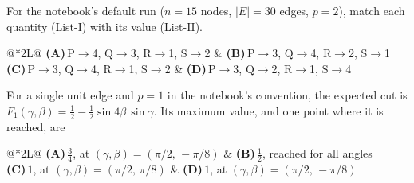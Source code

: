 \documentclass[11pt,a4paper]{article}
\newcommand{\optlabel}[1]{\textbf{(#1)}}
\newenvironment{qitem}[1]{\begin{list}{}{\setlength{\leftmargin}{3.3em}\setlength{\labelwidth}{3.1em}%
  \setlength{\labelsep}{0.2em}\setlength{\topsep}{3pt}\setlength{\parsep}{3pt}}\item[\textbf{Q.#1}\hfill]}{\end{list}}
\newcommand{\qsep}{\par\vspace{2pt}{\color{black!15}\hrule}\vspace{4pt}}
\begin{document}
\begin{qitem}{46}
For the notebook's default run ($n = 15$ nodes, $|E| = 30$ edges, $p = 2$), match each quantity (List-I) with its value
(List-II).
\par\smallskip{}
\par\smallskip\noindent\begin{tabularx}{\linewidth}{@{}*{2}{L}@{}}
\optlabel{A}\,P$\to$4, Q$\to$3, R$\to$1, S$\to$2 & \optlabel{B}\,P$\to$3, Q$\to$4, R$\to$2, S$\to$1 \\[3pt]
\optlabel{C}\,P$\to$3, Q$\to$4, R$\to$1, S$\to$2 & \optlabel{D}\,P$\to$3, Q$\to$2, R$\to$1, S$\to$4
\end{tabularx}
\end{qitem}
\qsep

\begin{qitem}{47}
For a single unit edge and $p = 1$ in the notebook's convention, the expected cut is
$F_1(\gamma, \beta) = \tfrac12 - \tfrac12\sin4\beta\,\sin\gamma$. Its maximum value, and one point where it is reached, are
\par\smallskip\noindent\begin{tabularx}{\linewidth}{@{}*{2}{L}@{}}
\optlabel{A}\,$\tfrac34$, at $(\gamma, \beta) = (\pi/2,\, -\pi/8)$ & \optlabel{B}\,$\tfrac12$, reached for all angles \\[3pt]
\optlabel{C}\,$1$, at $(\gamma, \beta) = (\pi/2,\, \pi/8)$ & \optlabel{D}\,$1$, at $(\gamma, \beta) = (\pi/2,\, -\pi/8)$
\end{tabularx}
\end{qitem}
\qsep
\end{document}
